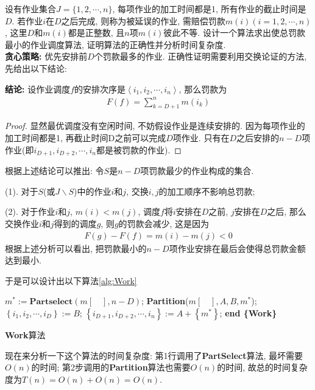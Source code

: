 \documentclass{article}
\begin{document}
\begin{homeworkProblem}
	设有作业集合$J=\{1,2,\cdots,n\}$, 每项作业的加工时间都是1, 所有作业的截止时间是$D$. 若作业$i$在$D$之后完成, 则称为被延误的作业, 需赔偿罚款$m(i)(i=1,2,\cdots,n)$, 这里$D$和$m(i)$都是正整数, 且$n$项$m(i)$彼此不等. 设计一个算法求出使总罚款最小的作业调度算法, 证明算法的正确性并分析时间复杂度.
	\\

	\solution \textbf{贪心策略:} 优先安排前$D$个罚款最多的作业. 正确性证明需要利用交换论证的方法, 先给出以下结论:

	\textbf{结论:} 设作业调度$f$的安排次序是$\left< i_1,i_2,\cdots ,i_n \right> $, 那么罚款为
	\begin{align}
		F\left( f \right) =\sum_{k=D+1}^n{m\left( i_k \right)}
	\end{align}
	\begin{proof}
		显然最优调度没有空闲时间, 不妨假设作业是连续安排的. 因为每项作业的加工时间都是1, 再截止时间D之前可以完成$D$项作业. 只有在$D$之后安排的$n-D$项作业(即$i_{D+1},i_{D+2},\cdots,i_{n}$都是被罚款的作业).
	\end{proof}
	根据上述结论可以推出: 令$S$是$n-D$项罚款最少的作业构成的集合.

	(1). 对于$S$(或$J\backslash S$)中的作业$i$和$j$, 交换$i,j$的加工顺序不影响总罚款;

	(2). 对于作业$i$和$j$, $m(i)<m(j)$, 调度$f$将$i$安排在$D$之前, $j$安排在$D$之后, 那么交换作业$i$和$j$得到的调度$g$, 则$g$的罚款会减少, 这是因为
	\begin{align}
		F(g) - F(f) = m(i) - m(j) < 0
	\end{align}
	根据上述分析可以看出, 把罚款最小的$n-D$项作业安排在最后会使得总罚款金额达到最小.

	于是可以设计出以下算法\ref{alg:Work}
	\begin{algorithm}[H]
		\begin{algorithmic}[1]
		\State $m^*:=\textbf{Partselect}(m[\quad],n-D)$;
		\State \textbf{Partition}($m[\quad],A,B,m^*$);
		\State $\left\{ i_1,i_2,\cdots ,i_D \right\} :=B$;
		\State $\left\{ i_{D+1},i_{D+2},\cdots ,i_n \right\} :=A+\left\{ m^* \right\}$;
		\State \textbf{end \{Work\}}
		\end{algorithmic}
		\caption{\textbf{Work}算法}
		\label{alg:Work}
	\end{algorithm}
	现在来分析一下这个算法的时间复杂度: 第1行调用了\textbf{PartSelect}算法, 最坏需要$O(n)$的时间; 第2步调用的\textbf{Partition}算法也需要$O(n)$的时间, 故总的时间复杂度为$T(n)=O(n)+O(n)=O(n)$.
\end{homeworkProblem}




\end{document}
